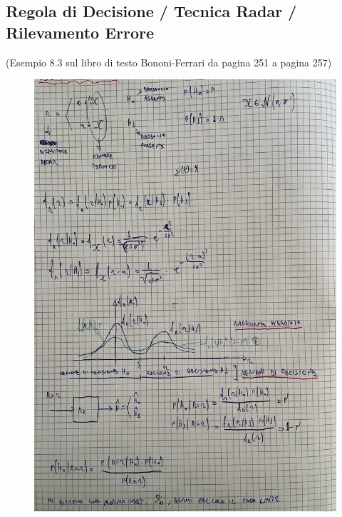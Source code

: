 \documentclass{article}
\begin{document}
\subsection{ Regola di Decisione / Tecnica Radar / Rilevamento Errore}
(Esempio 8.3 sul libro di testo Bononi-Ferrari da pagina 251 a pagina 257)
\begin{figure}[ht]
\centering
\includegraphics[scale=0.13]{ese/24.jpeg}
\end{figure} 
\end{document}
